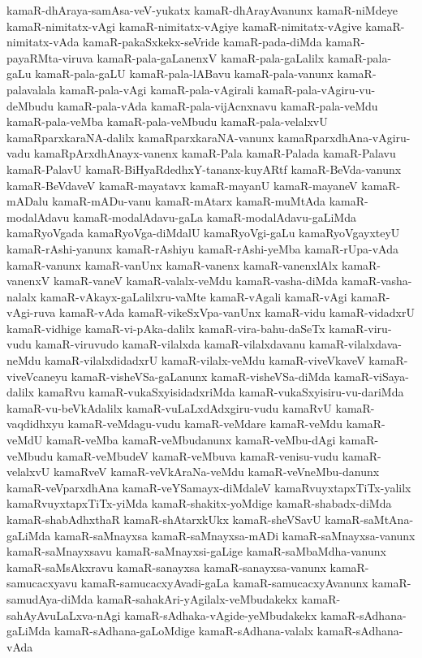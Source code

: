 {kamaR-dhAraya-samAsa-veV-yukatx
kamaR-dhArayAvanunx
kamaR-niMdeye
kamaR-nimitatx-vAgi
kamaR-nimitatx-vAgiye
kamaR-nimitatx-vAgive
kamaR-nimitatx-vAda
kamaR-pakaSxkekx-seVride
kamaR-pada-diMda
kamaR-payaRMta-viruva
kamaR-pala-gaLanenxV
kamaR-pala-gaLalilx
kamaR-pala-gaLu
kamaR-pala-gaLU
kamaR-pala-lABavu
kamaR-pala-vanunx
kamaR-palavalala
kamaR-pala-vAgi
kamaR-pala-vAgirali
kamaR-pala-vAgiru-vu-deMbudu
kamaR-pala-vAda
kamaR-pala-vijAcnxnavu
kamaR-pala-veMdu
kamaR-pala-veMba
kamaR-pala-veMbudu
kamaR-pala-velalxvU
kamaRparxkaraNA-dalilx
kamaRparxkaraNA-vanunx
kamaRparxdhAna-vAgiru-vadu
kamaRpArxdhAnayx-vanenx
kamaR-Pala
kamaR-Palada
kamaR-Palavu
kamaR-PalavU
kamaR-BiHyaRdedhxY-tananx-kuyARtf
kamaR-BeVda-vanunx
kamaR-BeVdaveV
kamaR-mayatavx
kamaR-mayanU
kamaR-mayaneV
kamaR-mADalu
kamaR-mADu-vanu
kamaR-mAtarx
kamaR-muMtAda
kamaR-modalAdavu
kamaR-modalAdavu-gaLa
kamaR-modalAdavu-gaLiMda
kamaRyoVgada
kamaRyoVga-diMdalU
kamaRyoVgi-gaLu
kamaRyoVgayxteyU
kamaR-rAshi-yanunx
kamaR-rAshiyu
kamaR-rAshi-yeMba
kamaR-rUpa-vAda
kamaR-vanunx
kamaR-vanUnx
kamaR-vanenx
kamaR-vanenxlAlx
kamaR-vanenxV
kamaR-vaneV
kamaR-valalx-veMdu
kamaR-vasha-diMda
kamaR-vasha-nalalx
kamaR-vAkayx-gaLalilxru-vaMte
kamaR-vAgali
kamaR-vAgi
kamaR-vAgi-ruva
kamaR-vAda
kamaR-vikeSxVpa-vanUnx
kamaR-vidu
kamaR-vidadxrU
kamaR-vidhige
kamaR-vi-pAka-dalilx
kamaR-vira-bahu-daSeTx
kamaR-viru-vudu
kamaR-viruvudo
kamaR-vilalxda
kamaR-vilalxdavanu
kamaR-vilalxdava-neMdu
kamaR-vilalxdidadxrU
kamaR-vilalx-veMdu
kamaR-viveVkaveV
kamaR-viveVcaneyu
kamaR-visheVSa-gaLanunx
kamaR-visheVSa-diMda
kamaR-viSaya-dalilx
kamaRvu
kamaR-vukaSxyisidadxriMda
kamaR-vukaSxyisiru-vu-dariMda
kamaR-vu-beVkAdalilx
kamaR-vuLaLxdAdxgiru-vudu
kamaRvU
kamaR-vaqdidhxyu
kamaR-veMdagu-vudu
kamaR-veMdare
kamaR-veMdu
kamaR-veMdU
kamaR-veMba
kamaR-veMbudanunx
kamaR-veMbu-dAgi
kamaR-veMbudu
kamaR-veMbudeV
kamaR-veMbuva
kamaR-venisu-vudu
kamaR-velalxvU
kamaRveV
kamaR-veVkAraNa-veMdu
kamaR-veVneMbu-danunx
kamaR-veVparxdhAna
kamaR-veYSamayx-diMdaleV
kamaRvuyxtapxTiTx-yalilx
kamaRvuyxtapxTiTx-yiMda
kamaR-shakitx-yoMdige
kamaR-shabadx-diMda
kamaR-shabAdhxthaR
kamaR-shAtarxkUkx
kamaR-sheVSavU
kamaR-saMtAna-gaLiMda
kamaR-saMnayxsa
kamaR-saMnayxsa-mADi
kamaR-saMnayxsa-vanunx
kamaR-saMnayxsavu
kamaR-saMnayxsi-gaLige
kamaR-saMbaMdha-vanunx
kamaR-saMsAkxravu
kamaR-sanayxsa
kamaR-sanayxsa-vanunx
kamaR-samucacxyavu
kamaR-samucacxyAvadi-gaLa
kamaR-samucacxyAvanunx
kamaR-samudAya-diMda
kamaR-sahakAri-yAgilalx-veMbudakekx
kamaR-sahAyAvuLaLxva-nAgi
kamaR-sAdhaka-vAgide-yeMbudakekx
kamaR-sAdhana-gaLiMda
kamaR-sAdhana-gaLoMdige
kamaR-sAdhana-valalx
kamaR-sAdhana-vAda
}
